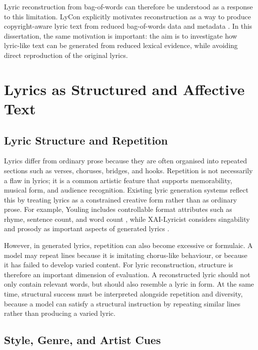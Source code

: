 Lyric reconstruction from bag-of-words can therefore be understood as a response to this limitation. LyCon explicitly motivates reconstruction as a way to produce copyright-aware lyric text from reduced bag-of-words data and metadata \cite{kim2024lycon}. In this dissertation, the same motivation is important: the aim is to investigate how lyric-like text can be generated from reduced lexical evidence, while avoiding direct reproduction of the original lyrics.

\section{Lyrics as Structured and Affective Text}

\subsection{Lyric Structure and Repetition}

Lyrics differ from ordinary prose because they are often organised into repeated sections such as verses, choruses, bridges, and hooks. Repetition is not necessarily a flaw in lyrics; it is a common artistic feature that supports memorability, musical form, and audience recognition. Existing lyric generation systems reflect this by treating lyrics as a constrained creative form rather than as ordinary prose. For example, Youling includes controllable format attributes such as rhyme, sentence count, and word count \cite{zhang2020youling}, while XAI-Lyricist considers singability and prosody as important aspects of generated lyrics \cite{liang2024xailyricist}.

However, in generated lyrics, repetition can also become excessive or formulaic. A model may repeat lines because it is imitating chorus-like behaviour, or because it has failed to develop varied content. For lyric reconstruction, structure is therefore an important dimension of evaluation. A reconstructed lyric should not only contain relevant words, but should also resemble a lyric in form. At the same time, structural success must be interpreted alongside repetition and diversity, because a model can satisfy a structural instruction by repeating similar lines rather than producing a varied lyric.

\subsection{Style, Genre, and Artist Cues}

